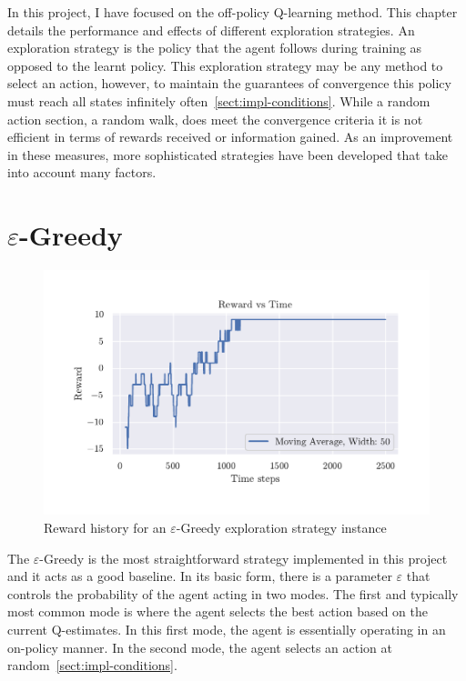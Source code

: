 \documentclass[]{final_report}
\begin{document}
In this project, I have focused on the off-policy Q-learning method. This chapter details the performance and effects of different exploration strategies. An exploration strategy is the policy that the agent follows during training as opposed to the learnt policy. This exploration strategy may be any method to select an action, however, to maintain the guarantees of convergence this policy must reach all states infinitely often~\ref{sect:impl-conditions}. While a random action section, a random walk, does meet the convergence criteria it is not efficient in terms of rewards received or information gained. As an improvement in these measures, more sophisticated strategies have been developed that take into account many factors.

\newpage
\section{\texorpdfstring{$\varepsilon$}{Lg}-Greedy}

\begin{figure}[H]
  \centering
  
  \includegraphics[trim={0 1cm 0 1cm},clip,width=\textwidth]{reward-history/EG.pdf}
  
  \caption{\label{fig:reward-history:eg} Reward history for an $\varepsilon$-Greedy exploration strategy instance}
\end{figure}


The $\varepsilon$-Greedy is the most straightforward strategy implemented in this project and it acts as a good baseline. In its basic form, there is a parameter $\varepsilon$ that controls the probability of the agent acting in two modes. The first and typically most common mode is where the agent selects the best action based on the current Q-estimates. In this first mode, the agent is essentially operating in an on-policy manner. In the second mode, the agent selects an action at random~\ref{sect:impl-conditions}.
\end{document}
